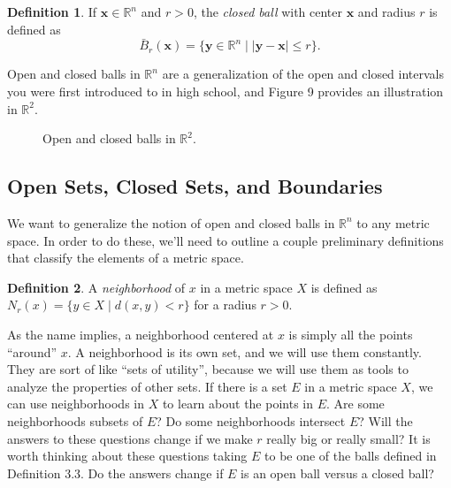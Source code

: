 \documentclass{article}
\newcommand{\R}{\mathbb{R}}
\newcommand{\x}{\mathbf{x}}
\newcommand{\y}{\mathbf{y}}
\theoremstyle{definition}
\newtheorem{definition}{Definition}[section]
\begin{document}
	\begin{definition}
		If $ \x\in\R^n $ and $ r>0 $, the \textit{\color{red} closed ball} with center $ \x $ and radius $ r $ is defined as $$ \bar{B}_r(\x)=\{\y\in\R^n\mid|\y-\x|\le r\}. $$ 
	\end{definition}
	Open and closed balls in $ \R^n $ are a generalization of the open and closed intervals you were first introduced to in high school, and Figure 9 provides an illustration in $ \R^2 $. 
	\begin{figure}[h!]
		\centering
		\caption{Open and closed balls in $ \R^2 $.}
	\end{figure}  
	\subsection{Open Sets, Closed Sets, and Boundaries}
	We want to generalize the notion of open and closed balls in $ \R^n $ to any metric space. In order to do these, we'll need to outline a couple preliminary definitions that classify the elements of a metric space. 
	\begin{definition}
		A \textit{\color{red}neighborhood } of $ x $ in a metric space $ X $ is defined as $ N_r(x)=\{y\in X\mid d(x,y)<r\} $ for a radius $ r>0 $.  
	\end{definition}
	As the name implies, a neighborhood centered at $ x $ is simply all the points ``around'' $ x $. A neighborhood is its own set, and we will use them constantly. They are sort of like ``sets of utility'', because we will use them as tools to analyze the properties of other sets. If there is a set $ E $ in a metric space $ X $, we can use neighborhoods in $ X $ to learn about the points in $ E $. Are some neighborhoods subsets of $ E $? Do some neighborhoods intersect $ E $? Will the answers to these questions change if we make $ r $ really big or really small? It is worth thinking about these questions taking $ E $ to be one of the balls defined in Definition 3.3. Do the answers change if $ E $ is an open ball versus a closed ball? 
	
\end{document}
